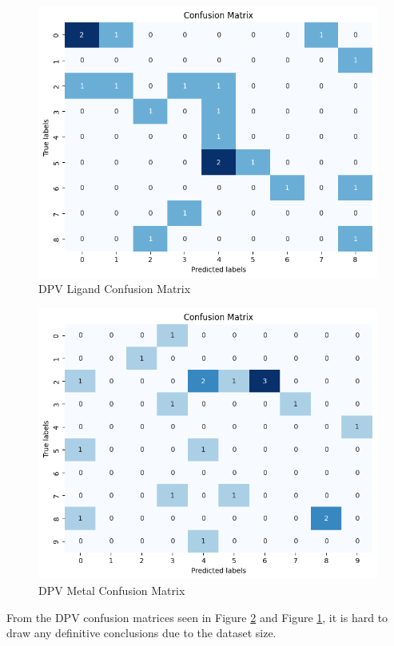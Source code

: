 \begin{figure}[h!]
  \centering
    \includegraphics[width=1.0\textwidth]{figures/dpv_ligand_matrix.png}
    \caption{DPV Ligand Confusion Matrix}
    \label{dpv_ligand_matrix}
\end{figure}
\begin{figure}[h!]
  \centering
    \includegraphics[width=1.0\textwidth]{figures/dpv_metal_matrix.png}
    \caption{DPV Metal Confusion Matrix}
    \label{dpv_metal_matrix}
\end{figure}
From the DPV confusion matrices seen in Figure \ref{dpv_metal_matrix} and Figure \ref{dpv_ligand_matrix}, it is hard to draw any definitive conclusions due to the dataset size. 
